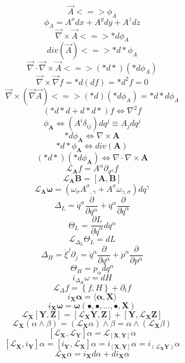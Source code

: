 \[
  {\vec A} <=> \phi_{A}
\]
\[
  \phi_{A} = A^x dx + A^y dy + A^z dz
\]
\[
  {\vec \nabla} \times {\vec A} <=> *d \phi_{A}
\]
\[
 div({\vec A}) <=> *d* \phi_{A}
\]
\[
  {\vec \nabla} \cdot {\vec \nabla} \times {\vec A} <=> (*d*)(*d \phi_{A})
\]
\[
  {\vec \nabla} \times {\vec \nabla} f = *d(df) = *d^2 f = 0
\]
\[
  {\vec \nabla} \times ( {\vec \nabla} {\vec A} ) <=> (*d)(*d \phi_{A} ) = *d*d \phi_{A}
\]
\[
(*d*d + d*d*) f \Leftrightarrow \nabla^2 f
\]
\[
  \phi_{\mathbf A} \Leftrightarrow \left( A^i \delta_{ij} \right) dq^j \equiv A_j dq^j
\]
\[
  * d \phi_{\mathbf A} \Leftrightarrow \nabla \times {\mathbf A}
\]
\[
  *d* \phi_{\mathbf A} \Leftrightarrow div({\mathbf A})
\]
\[
(*d*)(*d \phi_{\mathbf A} ) \Leftrightarrow \nabla \cdot \nabla \times {\mathbf A}
\]
\[
  {\mathcal L}_{\mathbf A} f = A^{\alpha} \partial_{q^{\alpha}} f
\]
\[
  {\mathcal L}_{\mathbf A} {\mathbf B} = [{\mathbf A},{\mathbf B}]
\]
\[
  {\mathcal L}_{\mathbf A} {\mathbf \omega} = ( \omega_{\sigma} {A^{\sigma}}_{,\gamma} + A^{\sigma} \omega_{\gamma,\sigma} ) d q^{\gamma}
\]
\[
  \Delta_L = {\dot q}^{\alpha} \frac{\partial}{\partial q^{\alpha}} + {\ddot q}^{\alpha} \frac{\partial}{\partial {\dot q}^{\alpha}}
\]
\[
  \Theta_L = \frac{\partial L}{\partial {\dot q}^{\alpha}} d q^{\alpha}
\]
\[
  {\mathcal L}_{\Delta_L} \Theta_L = d L
\]
\[
  \Delta_H = {\dot \xi}^{j} \partial_j = {\dot q}^{\alpha} \frac{\partial}{\partial {q^{\alpha}}} + {\dot p}^{\alpha} \frac{\partial}{\partial {p^{\alpha}}}
\]
\[
  \Theta_H = p_{\alpha} d q^{\alpha}
\]
\[
  i_{\Delta_H} \omega = d H
\]
\[
 {\mathcal L}_{\Delta} f = \left\{ f , H \right\} + \partial_t f
\]
\[
  i_{\mathbf X} {\mathbf \alpha} = \langle {\mathbf \alpha} , {\mathbf X} \rangle
\]
\[
  i_{\mathbf X} {\mathbf \omega} = {\mathbf \omega} \left( \bullet , \bullet, \dots, \bullet, {\mathbf X} \right)
\]
\[
   {\mathcal L}_{\mathbf X} \left[ {\mathbf Y}, {\mathbf Z} \right] 
 = \left[ {\mathcal L}_{\mathbf X} {\mathbf Y}, {\mathbf Z} \right] + \left[ {\mathbf Y}, {\mathcal L}_{\mathbf X} {\mathbf Z} \right]
\]
\[
  {\mathcal L}_{\mathbf X} \left( \alpha \wedge \beta \right) 
 = \left( {\mathcal L}_{\mathbf X} \alpha \right) \wedge \beta
 = \alpha \wedge \left( {\mathcal L}_{\mathbf X} \beta \right) 
\]
\[
  \left[ {\mathcal L}_{\mathbf X}, {\mathcal L}_{\mathbf Y} \right] \alpha = {\mathcal L}_{\left[ {\mathbf X}, {\mathbf Y} \right] } \alpha
\]
\[
    \left[ {\mathcal L}_{\mathbf X} , i_{\mathbf Y} \right] \alpha 
  = \left[ i_{\mathbf Y}, {\mathcal L}_{\mathbf X} \right] \alpha 
  = i_{\left[ {\mathbf X}, {\mathbf Y} \right] } \alpha
  = i_{ \left( {\mathcal L}_{\mathbf X} {\mathbf Y} \right) } \alpha
\]
\[
 {\mathcal L}_{\mathbf X} \alpha = i_{\mathbf X} d \alpha + d i_{\mathbf X} \alpha
\]

\newpage